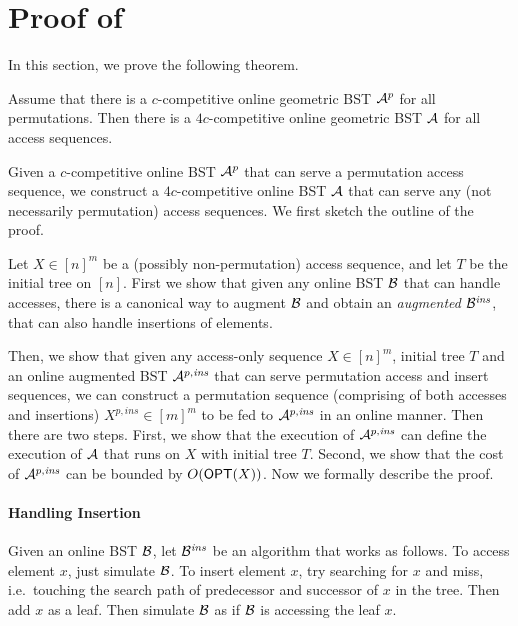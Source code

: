 \section{Proof of }
\label{sec:perm-enough}

In this section, we prove the following theorem.

\begin{theorem}
	Assume that there is a $c$-competitive online geometric BST ${\mathcal{A}}^{p}$ for
	all permutations. %
	Then there is a $4c$-competitive online geometric
	BST ${\mathcal{A}}$ for all access sequences.
\end{theorem}
Given a $c$-competitive online BST ${\mathcal{A}}^p$ that can serve a permutation access sequence, we construct 
a $4c$-competitive online BST ${\mathcal{A}}$ that can serve any (not necessarily permutation) access sequences.
We first sketch the outline of the proof.

Let $X\in[n]^{m}$ be a (possibly non-permutation) access sequence, and let $T$ be the initial tree on $[n]$. 
First we show that given any online BST ${\mathcal{B}}$ that can handle accesses, 
there is a canonical way to augment ${\mathcal{B}}$ and obtain an \emph{augmented} ${\mathcal{B}}^{\mathit{ins}}$, that can also handle insertions of elements.

Then, we show that given any access-only sequence $X \in [n]^m$, initial tree $T$ and
an online augmented BST ${{\mathcal{A}}}^{p,\mathit{ins}}$ that can serve permutation access and insert sequences,
we can construct a permutation sequence (comprising of both accesses and insertions) $X^{p,\mathit{ins}} \in [m]^m$ 
to be fed to ${\mathcal{A}}^{p,\mathit{ins}}$ in an online manner. Then there are two steps.
First, we show that the execution of ${\mathcal{A}}^{p,\mathit{ins}}$  can define the execution of ${\mathcal{A}}$ that runs on $X$ with initial tree $T$.
Second, we show that the cost of ${\mathcal{A}}^{p,\mathit{ins}}$ can be bounded by $O(\mbox{\sf OPT}(X))$.
Now we formally describe the proof.

\paragraph{Handling Insertion}
Given an online BST ${\mathcal{B}}$, let ${\mathcal{B}}^{\mathit{ins}}$ be an algorithm that works as follows. 
To access element $x$, just simulate ${\mathcal{B}}$. To insert element $x$, 
try searching for $x$ and miss, i.e.\ touching the search path of predecessor and successor of $x$ in the tree. Then add $x$ as a leaf. Then simulate ${\mathcal{B}}$ as if ${\mathcal{B}}$ is accessing the leaf $x$.

